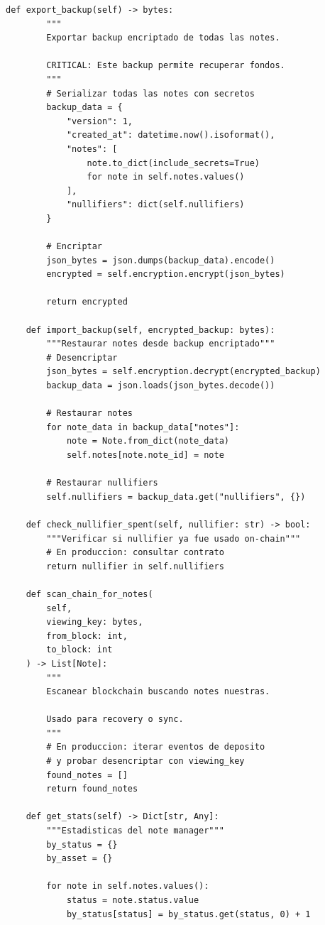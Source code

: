 \documentclass[11pt,a4paper,twoside]{book}
\theoremstyle{definition}
\theoremstyle{remark}
\begin{document}
\begin{lstlisting}[style=python, caption={Sistema completo de gestión de notes}]
    def export_backup(self) -> bytes:
        """
        Exportar backup encriptado de todas las notes.
        
        CRITICAL: Este backup permite recuperar fondos.
        """
        # Serializar todas las notes con secretos
        backup_data = {
            "version": 1,
            "created_at": datetime.now().isoformat(),
            "notes": [
                note.to_dict(include_secrets=True)
                for note in self.notes.values()
            ],
            "nullifiers": dict(self.nullifiers)
        }
        
        # Encriptar
        json_bytes = json.dumps(backup_data).encode()
        encrypted = self.encryption.encrypt(json_bytes)
        
        return encrypted
    
    def import_backup(self, encrypted_backup: bytes):
        """Restaurar notes desde backup encriptado"""
        # Desencriptar
        json_bytes = self.encryption.decrypt(encrypted_backup)
        backup_data = json.loads(json_bytes.decode())
        
        # Restaurar notes
        for note_data in backup_data["notes"]:
            note = Note.from_dict(note_data)
            self.notes[note.note_id] = note
        
        # Restaurar nullifiers
        self.nullifiers = backup_data.get("nullifiers", {})
    
    def check_nullifier_spent(self, nullifier: str) -> bool:
        """Verificar si nullifier ya fue usado on-chain"""
        # En produccion: consultar contrato
        return nullifier in self.nullifiers
    
    def scan_chain_for_notes(
        self,
        viewing_key: bytes,
        from_block: int,
        to_block: int
    ) -> List[Note]:
        """
        Escanear blockchain buscando notes nuestras.
        
        Usado para recovery o sync.
        """
        # En produccion: iterar eventos de deposito
        # y probar desencriptar con viewing_key
        found_notes = []
        return found_notes
    
    def get_stats(self) -> Dict[str, Any]:
        """Estadisticas del note manager"""
        by_status = {}
        by_asset = {}
        
        for note in self.notes.values():
            status = note.status.value
            by_status[status] = by_status.get(status, 0) + 1
            

\end{lstlisting}
\end{document}
